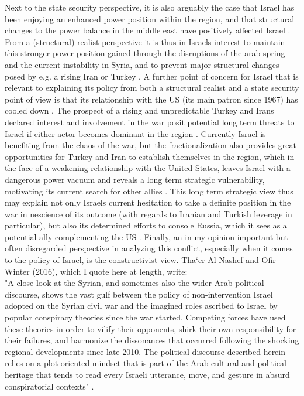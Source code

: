 \documentclass[a4paper]{article}\twocolumn
\begin{document}
Next to the state security perspective, it is also arguably the case that Israel has been enjoying an enhanced power position within the region, and that structural changes to the power balance in the middle east have positively affected Israel \cite{friedman_2016}. From a (structural) realist perspective it is thus in Israels interest to maintain this stronger power-position gained through the disruptions of the arab-spring and the current instability in Syria, and to prevent major structural changes posed by e.g. a rising Iran or Turkey \cite{friedman_2016}. A further point of concern for Israel that is relevant to explaining its policy from both a structural realist and a state security point of view is that its relationship with the US (its main patron since 1967) has cooled down \cite{friedman_2016}. The prospect of a rising and unpredictable Turkey and Irans declared interest and involvement in the war posit potential long term threats to Israel if either actor becomes dominant in the region \cite{friedman_2016}. Currently Israel is benefiting from the chaos of the war, but the fractionalization also provides great opportunities for Turkey and Iran to establish themselves in the region, which in the face of a weakening relationship with the United States, leaves Israel with a dangerous power vacuum and reveals a long term strategic vulnerability, motivating its current search for other allies \cite{friedman_2016}. This long term strategic view thus may explain not only Israels current hesitation to take a definite position in the war in nescience of its outcome (with regards to Iranian and Turkish leverage in particular), but also its determined efforts to console Russia, which it sees as a potential ally complementing the US \cite{aronson_2017,ravid_2017,friedman_2016}. Finally, an in my opinion important but often disregarded perspective in analyzing this conflict, especially when it comes to the policy of Israel, is the constructivist view. Tha‘er Al-Nashef and Ofir Winter (2016), which I quote here at length, write: \newline \\ "A close look at the Syrian, and sometimes also the wider Arab political discourse, shows the vast gulf between the policy of non-intervention Israel adopted on the Syrian civil war and the imagined roles ascribed to Israel by popular conspiracy theories since the war started. Competing forces have used these theories in order to vilify their opponents, shirk their own responsibility for their failures, and harmonize the dissonances that occurred following the shocking regional developments since late 2010. The political discourse described herein relies on a plot-oriented mindset that is part of the Arab cultural and political heritage that tends to read every Israeli utterance, move, and gesture in absurd conspiratorial contexts" \cite{Winter2016}. \newline \\
\end{document}

